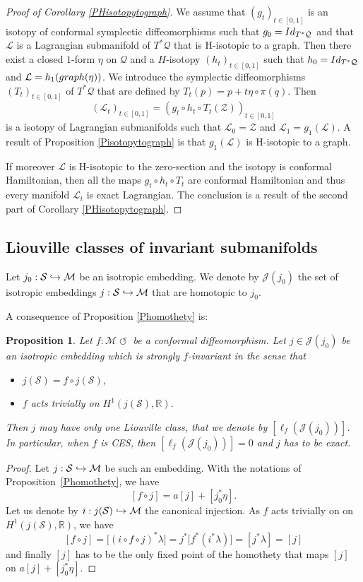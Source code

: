 \documentclass[11pt]{article}
\numberwithin{equation}{section}
\numberwithin{figure}{section}
\numberwithin{table}{section}
\def\hto{\mathrel{\lhook\joinrel\to}}
\providecommand{\righttoleftarrow}{\mathrel{\circlearrowleft}}
\newtheorem{proposition}{Proposition}
\theoremstyle{definition}
\def\R{\mathbb{R}}
\def\cL{{\mathcal L}}
\def\cJ{{\mathcal J}}
\def\cM{{\mathcal M}}
\def\cQ{{\mathcal Q}}
\def\cS{{\mathcal S}}
\def\cZ{{\mathcal Z}}
\begin{document}
\begin{proof}[Proof of Corollary \ref{PHisotopytograph}]
We assume that $(g_t)_{t\in[0, 1]}$ is an isotopy of conformal symplectic diffeomorphisms such that $g_0={\rm Id}_{T^*\cQ}$ and that $\cL$ is a Lagrangian submanifold of $T^*\cQ$ that is H-isotopic to a graph. Then there exist a closed $1$-form $\eta$ on $\cQ$ and a $H$-isotopy $(h_t)_{t\in[0,1]}$ such that $h_0={\rm Id}_{T^*\cQ}$ and $\cL=h_1({\rm graph}(\eta))$. We introduce the symplectic diffeomorphisms $(T_t)_{t\in[0, 1]}$ of $T^*\cQ$ that are defined by $T_t(p)=p+t\eta\circ \pi(q)$. Then
\[
(\cL_t)_{t\in[0,1]}=(g_t\circ h_t\circ T_t(\cZ))_{t\in[0,1]}
\]
is a isotopy of Lagrangian submanifolds such that $\cL_0=\cZ$ and $\cL_1=g_1(\cL)$. A result of Proposition \ref{Pisotopytograph} is that $g_1(\cL)$ is H-isotopic to a graph.

If moreover $\cL$ is H-isotopic to the zero-section and the isotopy is conformal Hamiltonian, then all the maps $g_t\circ h_t\circ T_t$ are conformal Hamiltonian and thus every manifold $\cL_t$ is exact Lagrangian. The conclusion is a result of the second part of Corollary \ref{PHisotopytograph}.
\end{proof}

\subsection{Liouville classes of invariant submanifolds}

Let $ j_0:\cS\hto\cM$ be an isotropic embedding. We denote by $\cJ(j_0)$ the set of isotropic embeddings $ j:\cS\hto\cM$ that are homotopic to $j_0$.

A consequence of Proposition \ref{Phomothety} is:
\begin{proposition}\label{Puniqueclass}
Let $f: \cM \righttoleftarrow$ be a conformal diffeomorphism. Let $j\in\cJ(j_0)$ be an isotropic embedding which is strongly $f$-invariant in the sense that
\begin{itemize}
\item
$j(\cS)=f\circ j(\cS)$,
\item
$f$ acts trivially on $H^1(j(\cS),\R)$.
\end{itemize}
Then $j$ may have only one Liouville class, that we denote by $[\ell_f(\cJ(j_0))]$.
In particular, when $f$ is CES, then $[\ell_f(\cJ(j_0))]=0$ and $j$ has to be exact.
\end{proposition}

\begin{proof}
Let $ j:\cS\hto\cM$ be such an embedding. With the notations of Proposition~\ref{Phomothety}, we have
\[
[f\circ j]=a[j]+[j_0^*\eta].
\]
Let us denote by $i:j(\cS)\hto\cM$ the canonical injection. As $f$ acts trivially on on $H^1(j(\cS),\R)$, we have
\[
[f\circ j]=\big[(i\circ f\circ j)^*\lambda\big]=j^*\big[f^*(i^*\lambda)\big]=[j^*\lambda]=[j]
\]
and finally $[j]$ has to be the only fixed point of the homothety that maps $[j]$ on $a[j]+[j_0^*\eta]$.
\end{proof}
\end{document}
